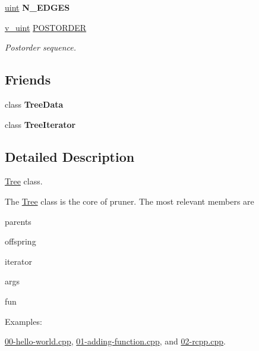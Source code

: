 \begin{DoxyCompactItemize}
\item 
\hyperlink{namespacepruner_a659e6e64a9e2b8e981c3d34262a2f67e}{uint} {\bfseries N\+\_\+\+E\+D\+G\+ES}\hypertarget{classpruner_1_1Tree_af3e29b31a9fd7e634df390462a44ef19}{}\label{classpruner_1_1Tree_af3e29b31a9fd7e634df390462a44ef19}

\item 
\hyperlink{namespacepruner_af0145646bd7ede012cd336b416bc5579}{v\+\_\+uint} \hyperlink{classpruner_1_1Tree_a547937e845fdbceafae4db25cd74f880}{P\+O\+S\+T\+O\+R\+D\+ER}
\begin{DoxyCompactList}\small\item\em Postorder sequence. \end{DoxyCompactList}\end{DoxyCompactItemize}
\subsection*{Friends}
\begin{DoxyCompactItemize}
\item 
class {\bfseries Tree\+Data}\hypertarget{classpruner_1_1Tree_a3ef069a6a857ec671312e3f76cb5aa24}{}\label{classpruner_1_1Tree_a3ef069a6a857ec671312e3f76cb5aa24}

\item 
class {\bfseries Tree\+Iterator}\hypertarget{classpruner_1_1Tree_a925e5a7f5dc110e63f7062d0e6898af9}{}\label{classpruner_1_1Tree_a925e5a7f5dc110e63f7062d0e6898af9}

\end{DoxyCompactItemize}


\subsection{Detailed Description}
\hyperlink{classpruner_1_1Tree}{Tree} class. 

The \hyperlink{classpruner_1_1Tree}{Tree} class is the core of pruner. The most relevant members are
\begin{DoxyItemize}
\item {\ttfamily parents}
\item {\ttfamily offspring}
\item {\ttfamily iterator}
\item {\ttfamily args}
\item {\ttfamily fun} 
\end{DoxyItemize}\begin{Desc}
\item[Examples\+: ]\par
\hyperlink{00-hello-world_8cpp-example}{00-\/hello-\/world.\+cpp}, \hyperlink{01-adding-function_8cpp-example}{01-\/adding-\/function.\+cpp}, and \hyperlink{02-rcpp_8cpp-example}{02-\/rcpp.\+cpp}.\end{Desc}


